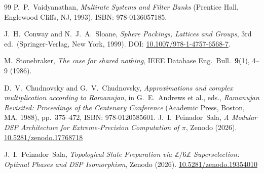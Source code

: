 \documentclass[12pt,a4paper]{article}
\theoremstyle{plain}
\theoremstyle{definition}
\theoremstyle{remark}
\begin{document}
\begin{thebibliography}{99}
P.~P.~Vaidyanathan, 
\emph{Multirate Systems and Filter Banks} 
(Prentice Hall, Englewood Cliffs, NJ, 1993), 
ISBN: 978-0136057185.

J.~H.~Conway and N.~J.~A.~Sloane, 
\emph{Sphere Packings, Lattices and Groups}, 
3rd ed.\ (Springer-Verlag, New York, 1999). 
DOI: \href{https://doi.org/10.1007/978-1-4757-6568-7}{10.1007/978-1-4757-6568-7}.

M.~Stonebraker, 
\emph{The case for shared nothing}, 
IEEE Database Eng.\ Bull.\ \textbf{9}(1), 4--9 (1986).

D.~V.~Chudnovsky and G.~V.~Chudnovsky, 
\emph{Approximations and complex multiplication according to Ramanujan}, 
in G.~E.~Andrews et al., eds., 
\emph{Ramanujan Revisited: Proceedings of the Centenary Conference} 
(Academic Press, Boston, MA, 1988), 
pp.~375--472, ISBN: 978-0120585601.
 J.~I.~Peinador~Sala, \emph{A Modular DSP Architecture for Extreme-Precision Computation of \(\pi\)}, Zenodo (2026). \href{https://doi.org/10.5281/zenodo.17768718}{10.5281/zenodo.17768718}

 J.~I.~Peinador~Sala, \emph{Topological State Preparation via \(\mathbb{Z}/6\mathbb{Z}\) Superselection: Optimal Phases and DSP Isomorphism}, Zenodo (2026).
\href{https://doi.org/10.5281/10.5281/zenodo.19354010}{10.5281/zenodo.19354010}
\end{thebibliography}
\end{document}
